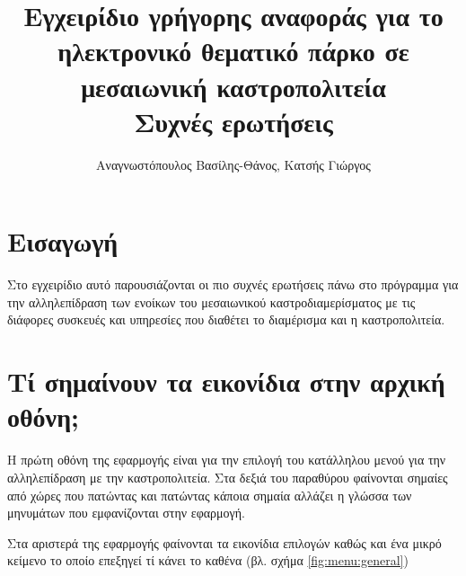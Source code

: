 \documentclass[a4paper,titlepage,twoside,12pt,leqno]{article}
\title{Εγχειρίδιο γρήγορης αναφοράς για το ηλεκτρονικό θεματικό πάρκο σε μεσαιωνική καστροπολιτεία \\ Συχνές ερωτήσεις}
\author{Αναγνωστόπουλος Βασίλης-Θάνος, Κατσής Γιώργος}
\date{}
\begin{document}
\maketitle
\tableofcontents
\listoffigures
\listoftables
\newpage

\section{Εισαγωγή}



Στο εγχειρίδιο αυτό παρουσιάζονται οι πιο συχνές ερωτήσεις πάνω στο πρόγραμμα για την αλληλεπίδραση των ενοίκων του μεσαιωνικού καστροδιαμερίσματος με τις διάφορες συσκευές και υπηρεσίες που διαθέτει το διαμέρισμα και η καστροπολιτεία.



\section{Τί σημαίνουν τα εικονίδια στην αρχική οθόνη;}

Η πρώτη οθόνη της εφαρμογής είναι για την επιλογή του κατάλληλου μενού για την αλληλεπίδραση με την καστροπολιτεία. Στα δεξιά του παραθύρου φαίνονται σημαίες από χώρες που πατώντας και πατώντας κάποια σημαία αλλάζει η γλώσσα των μηνυμάτων που εμφανίζονται στην εφαρμογή.

Στα αριστερά της εφαρμογής φαίνονται τα εικονίδια επιλογών καθώς και ένα μικρό κείμενο το οποίο επεξηγεί τί κάνει το καθένα (βλ. σχήμα \ref{fig:menu:general})
\end{document}
